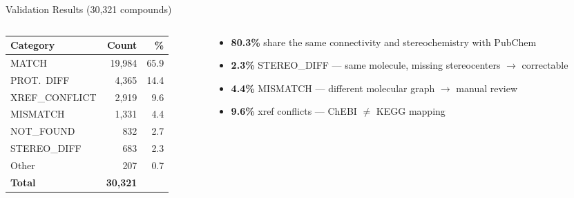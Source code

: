 \documentclass[aspectratio=169,11pt]{beamer}
\begin{document}
\begin{frame}{Validation Results (30,321 compounds)}

\begin{columns}[T]
\begin{column}{0.40\textwidth}
\small
\begin{table}[h]
\centering
\small
\begin{tabular}{lrr}
\toprule
\textbf{Category} & \textbf{Count} & \textbf{\%} \\
\midrule
MATCH             & 19,984 & 65.9 \\
PROT.\ DIFF       &  4,365 & 14.4 \\
XREF\_CONFLICT    &  2,919 &  9.6 \\
MISMATCH          &  1,331 &  4.4 \\
NOT\_FOUND        &    832 &  2.7 \\
STEREO\_DIFF      &    683 &  2.3 \\
Other             &    207 &  0.7 \\
\midrule
\textbf{Total}    & \textbf{30,321} & \\
\bottomrule
\end{tabular}
\end{table}
\end{column}

\begin{column}{0.56\textwidth}
\begin{itemize}\setlength\itemsep{6pt}
  \item \textbf{80.3\%} share the same connectivity
        and stereochemistry with PubChem
  \item \textbf{2.3\%} STEREO\_DIFF --- same molecule,
        missing stereocenters $\to$ correctable
  \item \textbf{4.4\%} MISMATCH --- different molecular
        graph $\to$ manual review
  \item \textbf{9.6\%} xref conflicts ---
        ChEBI $\neq$ KEGG mapping
\end{itemize}
\end{column}
\end{columns}

\end{frame}
\end{document}
